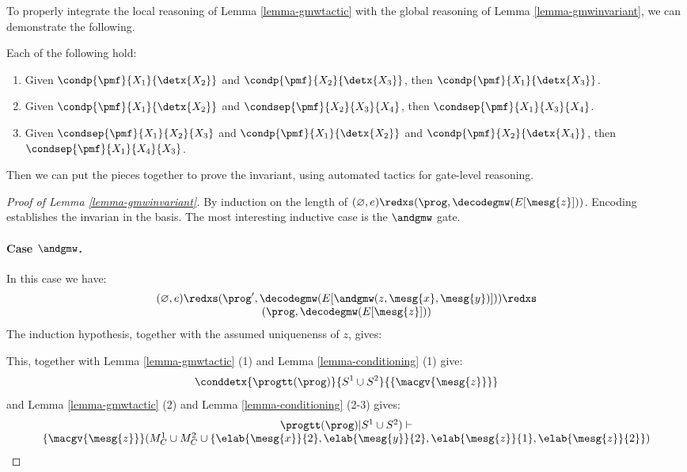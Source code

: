 To properly integrate the local reasoning of Lemma \ref{lemma-gmwtactic} with
the global reasoning of Lemma \ref{lemma-gmwinvariant}, we can demonstrate
the following.
\begin{lemma}
  \label{lemma-conditioning}
  Each of the following hold:
  \begin{enumerate}
    \item Given $\condp{\pmf}{X_1}{\detx{X_2}}$ and
      $\condp{\pmf}{X_2}{\detx{X_3}}$, then $\condp{\pmf}{X_1}{\detx{X_3}}$.
    \item Given $\condp{\pmf}{X_1}{\detx{X_2}}$ and
      $\condsep{\pmf}{X_2}{X_3}{X_4}$, then $\condsep{\pmf}{X_1}{X_3}{X_4}$.
    \item Given $\condsep{\pmf}{X_1}{X_2}{X_3}$ and $\condp{\pmf}{X_1}{\detx{X_2}}$
      and $\condp{\pmf}{X_2}{\detx{X_4}}$, then $\condsep{\pmf}{X_1}{X_4}{X_3}$.
  \end{enumerate}
\end{lemma}

Then we can put the pieces together to prove the invariant, using automated tactics
for gate-level reasoning.  
\begin{proof}[Proof of Lemma \ref{lemma-gmwinvariant}]
  By induction on the length of $(\varnothing,e) \redxs (\prog,\decodegmw(E[\mesg{z}]))$.
  Encoding establishes the invarian in the basis. The most interesting inductive
  case is the $\andgmw$ gate. 
  \paragraph{Case $\andgmw$.} In this case we have:
  $$
  \begin{array}{c}
  (\varnothing,e) \redxs (\prog',\decodegmw(E[\andgmw(z,\mesg{x},\mesg{y})])) \redxs \\
    (\prog,\decodegmw(E[\mesg{z}]))
  \end{array}
  $$
  The induction hypothesis, together with the assumed uniquenenss of $z$, gives:
  \begin{mathpar}
  

  
  \end{mathpar}
  This, together with Lemma \ref{lemma-gmwtactic} (1) and Lemma \ref{lemma-conditioning} (1)
  give:
  $$
  \conddetx{\progtt(\prog)}{S^1 \cup S^2}{\{ \macgv{\mesg{z}} \}}
  $$
  and Lemma  \ref{lemma-gmwtactic} (2) and Lemma \ref{lemma-conditioning} (2-3) gives:
  $$
  \begin{array}{c}
    \progtt(\prog)|S^1 \cup S^2) \vdash \\
    {\{ \macgv{\mesg{z}} \}}{(M^1_C \cup M^2_C \cup \{ \elab{\mesg{x}}{2}, \elab{\mesg{y}}{2}, \elab{\mesg{z}}{1}, \elab{\mesg{z}}{2} \})}
  \end{array}
  $$
\end{proof}

